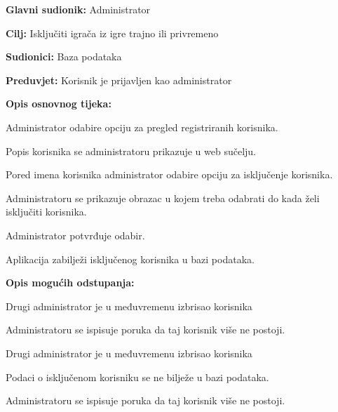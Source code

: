 				\noindent {}
				\begin{packed_item}
					
					\item \textbf{Glavni sudionik: }Administrator
					\item  \textbf{Cilj:} Isključiti igrača iz igre trajno ili privremeno
					\item  \textbf{Sudionici:} Baza podataka
					\item  \textbf{Preduvjet:} Korisnik je prijavljen kao administrator
					\item  \textbf{Opis osnovnog tijeka:}
					
					\item[] \begin{packed_enum}
						
						\item Administrator odabire opciju za pregled registriranih korisnika.
						\item Popis korisnika se administratoru prikazuje u web sučelju.
						\item Pored imena korisnika administrator odabire opciju za isključenje korisnika.
						\item Administratoru se prikazuje obrazac u kojem treba odabrati do kada želi isključiti korisnika.
						\item Administrator potvrđuje odabir.
						\item Aplikacija zabilježi isključenog korisnika u bazi podataka.
					\end{packed_enum}
					
					\item  \textbf{Opis mogućih odstupanja:}
					
					\item[] \begin{packed_item}
						
						\item[3.a] Drugi administrator je u međuvremenu izbrisao korisnika
						\item[] \begin{packed_enum}
							
							\item Administratoru se ispisuje poruka da taj korisnik više ne postoji.
							
						\end{packed_enum}
						\item[5.a] Drugi administrator je u međuvremenu izbrisao korisnika
						\item[] \begin{packed_enum}
							
							\item Podaci o isključenom korisniku se ne bilježe u bazi podataka.
							\item Administratoru se ispisuje poruka da taj korisnik više ne postoji.
							
						\end{packed_enum}
						
					\end{packed_item}
				\end{packed_item}
				
